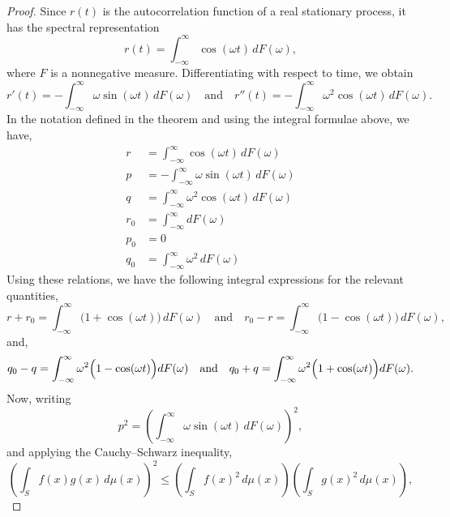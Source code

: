 \documentclass[journal]{IEEEtran}
\theoremstyle{plain}
\theoremstyle{definition}
\theoremstyle{remark}
\begin{document}
\begin{proof}
Since $r(t)$ is the autocorrelation function of a real stationary process, it has the spectral representation
\begin{equation}
    r(t)=\int_{-\infty}^{\infty}\cos(\omega t)\,dF(\omega),
\end{equation}
where $F$ is a nonnegative measure. Differentiating with respect to time, we obtain
\begin{equation}
    r'(t)=-\int_{-\infty}^{\infty}\omega\sin(\omega t)\,dF(\omega)
    \quad\text{and}\quad
    r''(t)=-\int_{-\infty}^{\infty}\omega^2\cos(\omega t)\,dF(\omega).
\end{equation}
In the notation defined in the theorem and using the integral formulae above, we have,
\begin{equation}
\begin{split}
    r &= \int_{-\infty}^{\infty}\cos(\omega t)\,dF(\omega) \\
    p &= -\int_{-\infty}^{\infty}\omega\sin(\omega t)\,dF(\omega) \\
    q &= \int_{-\infty}^{\infty}\omega^2\cos(\omega t)\,dF(\omega) \\
    r_0 &= \int_{-\infty}^{\infty}dF(\omega) \\
    p_0 &= 0 \\
    q_0 &= \int_{-\infty}^{\infty}\omega^2 \,dF(\omega)
\end{split}
\end{equation}
Using these relations, we have the following integral expressions for the relevant quantities,
\begin{equation}
    r+r_0=\int_{-\infty}^{\infty}\bigl(1+\cos(\omega t)\bigr)\,dF(\omega)
    \quad\text{and}\quad
    r_0-r=\int_{-\infty}^{\infty}\bigl(1-\cos(\omega t)\bigr)\,dF(\omega),
\end{equation}
and,
\begin{equation}
    q_0-q=\int_{-\infty}^{\infty}\omega^2\Bigl(1-\cos(\omega t)\Bigr)dF(\omega)
    \quad\text{and}\quad
    q_0+q=\int_{-\infty}^{\infty}\omega^2\Bigl(1+\cos(\omega t)\Bigr)dF(\omega).    
\end{equation}
Now, writing
\begin{equation}
    p^2=\left(\int_{-\infty}^{\infty}\omega\sin(\omega t)\,dF(\omega)\right)^2,    
\end{equation}
and applying the Cauchy--Schwarz inequality,
\begin{equation}
\left( \int_{S} f(x) g(x) \, d\mu(x) \right)^2 \le \left( \int_{S} f(x)^2 \, d\mu(x) \right) \left( \int_{S} g(x)^2 \, d\mu(x) \right), 

\end{equation}
\end{proof}
\end{document}
